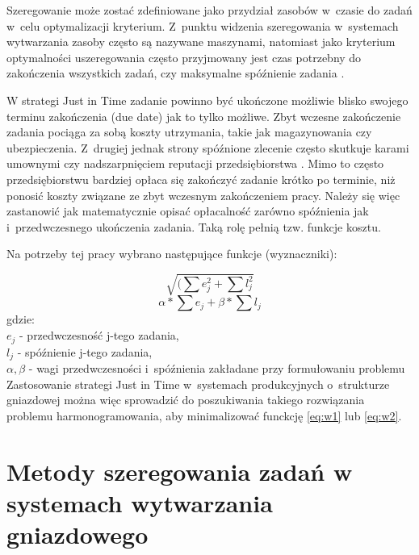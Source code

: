 \documentclass[twoside]{kInzynierka}
\begin{document}
Szeregowanie może zostać zdefiniowane jako przydział zasobów w~czasie do zadań w~celu optymalizacji kryterium. Z~punktu widzenia szeregowania w~systemach wytwarzania zasoby często są nazywane maszynami, natomiast jako kryterium optymalności uszeregowania często przyjmowany jest czas potrzebny do zakończenia wszystkich zadań, czy maksymalne spóźnienie zadania \cite{antColony}.

W strategi Just in Time zadanie powinno być ukończone możliwie blisko swojego terminu zakończenia (due date) jak to tylko możliwe. Zbyt wczesne zakończenie zadania pociąga za sobą koszty utrzymania, takie jak magazynowania czy ubezpieczenia. Z~drugiej jednak strony spóźnione zlecenie często skutkuje karami umownymi czy nadszarpnięciem reputacji przedsiębiorstwa \cite{genetyczne}. Mimo to często przedsiębiorstwu bardziej opłaca się zakończyć zadanie krótko po terminie, niż ponosić koszty związane ze zbyt wczesnym zakończeniem pracy. Należy się więc zastanowić jak matematycznie opisać opłacalność zarówno spóźnienia jak i~przedwczesnego ukończenia zadania. Taką rolę pełnią tzw. funkcje kosztu.

Na potrzeby tej pracy wybrano następujące funkcje (wyznaczniki):

\begin{equation}
    \sqrt{(\sum e_j^2 + \sum l_j^2}
    \label{eq:w1}
\end{equation}
\begin{equation}
    \alpha*\sum e_j + \beta*\sum l_j
    \label{eq:w2}
\end{equation}
gdzie: \\
\(e_j\) - przedwczesność j-tego zadania, \\
\(l_j\) - spóźnienie j-tego zadania, \\
\(\alpha, \beta\) - wagi przedwczesności i~spóźnienia zakładane przy formułowaniu problemu\\

Zastosowanie strategi Just in Time w~systemach produkcyjnych o~strukturze gniazdowej można więc sprowadzić do poszukiwania takiego rozwiązania problemu harmonogramowania, aby minimalizować funckcję \ref{eq:w1} lub \ref{eq:w2}.

\section       [Metody szeregowania zadań \ldots]
		        {Metody szeregowania zadań \newline w systemach wytwarzania gniazdowego}
\end{document}
